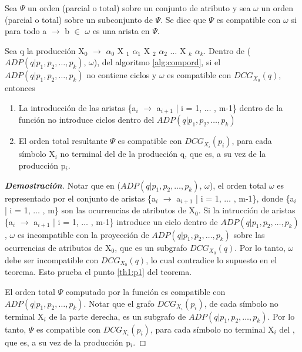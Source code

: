 \begin{definition}
Sea $\Psi$ un orden (parcial o total) sobre un conjunto de atributo y sea $\omega$ un orden (parcial o total) sobre un subconjunto de $\Psi$. Se dice que $\Psi$ es compatible con $\omega$ si para todo a $\rightarrow$ b $\in$ $\omega$ es una arista en $\Psi$.
\end{definition}


\begin{theorem}
\label{th1}
Sea q la producción X$_{0}$ $\rightarrow$ $\alpha_{0}$ X $_{1}$ $\alpha_{1}$ X $_{2}$ $\alpha_{2}$ $\ldots$ X $_{k}$ $\alpha_{k}$. Dentro de ($ADP (q | p_{1}, p_{2}, \dots, p_{k})$, $\omega$), del algoritmo \ref{alg:compord}, si el $ADP (q | p_{1}, p_{2}, \dots, p_{k})$ no contiene ciclos y $\omega$ es compatible con $DCG_{X_{0}}(q)$, entonces

\begin{enumerate}
    \item \label{th1:p1}La introducción de las aristas \{a$_{i}$ $\rightarrow$ a$_{i+1}$ | i = 1, $\ldots$ , m-1\} dentro de la función  no introduce ciclos dentro del $ADP (q | p_{1}, p_{2}, \dots, p_{k})$
 
    \item \label{th1:p2}El orden total resultante $\Psi$ es compatible con $DCG_{X_{i}}(p_{i})$, para cada símbolo X$_{i}$ no terminal del  de la producción q, que es, a su vez  de la producción p$_{i}$.
\end{enumerate}

\end{theorem}

\begin{proof}[\textbf{Demostración}]

Notar que en ($ADP (q | p_{1}, p_{2}, \dots, p_{k})$, $\omega$), el orden total $\omega$ es representado por el conjunto de aristas \{a$_{i}$ $\rightarrow$ a$_{i+1}$ | i = 1, $\ldots$ , m-1\}, donde \{a$_{i}$ | i = 1, $\ldots$ , m\} son las ocurrencias de atributos de X$_{0}$. Si la intrucción de aristas \{a$_{i}$ $\rightarrow$ a$_{i+1}$ | i = 1, $\ldots$ , m-1\} introduce un ciclo dentro de $ADP (q | p_{1}, p_{2}, \dots, p_{k})$, $\omega$ es incompatible con la proyección de $ADP (q | p_{1}, p_{2}, \dots, p_{k})$ sobre las ocurrencias de atributos de X$_{0}$, que es un subgrafo $DCG_{X_{0}}(q)$. Por lo tanto, $\omega$ debe ser incompatible con $DCG_{X_{0}}(q)$, lo cual contradice lo supuesto en el teorema. Esto prueba el punto \ref{th1:p1} del teorema.

El orden total $\Psi$ computado por la función  es compatible con $ADP (q | p_{1}, p_{2}, \dots, p_{k})$. Notar que el grafo $DCG_{X_{i}}(p_{i})$, de cada símbolo no terminal X$_{i}$ de la parte derecha, es un subgrafo de $ADP (q | p_{1}, p_{2}, \dots, p_{k})$. Por lo tanto, $\Psi$ es compatible con $DCG_{X_{i}}(p_{i})$, para cada símbolo no terminal X$_{i}$ del , que es, a su vez  de la producción p$_{i}$.

\end{proof}

